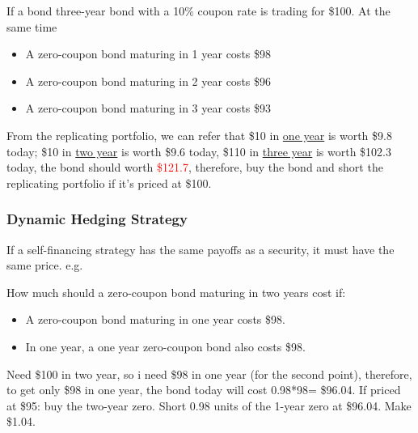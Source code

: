 \begin{multicols}{2}
If a bond three-year bond with a 10\% coupon rate is trading for \$100. At the same time 
\begin{itemize}
    \item A zero-coupon bond maturing in 1 year costs \$98
    \item A zero-coupon bond maturing in 2 year costs \$96
    \item A zero-coupon bond maturing in 3 year costs \$93
\end{itemize}

From the replicating portfolio, we can refer that \$10 in \underline{one year} is worth \$9.8 today; \$10 in \underline{two year} is worth \$9.6 today, \$110 in \underline{three year} is worth \$102.3 today, the bond should worth \textcolor{red}{\$121.7}, therefore, buy the bond and short the replicating portfolio if it's priced at \$100.

\subsubsection{Dynamic Hedging Strategy}
If a self-financing strategy has the same payoffs as a security, it must have the same price. e.g.\par 

How much should a zero-coupon bond maturing in two years cost if:
\begin{itemize}
    \item A zero-coupon bond maturing in one year costs \$98.
    \item In one year, a one year zero-coupon bond also costs \$98.
\end{itemize}
Need \$100 in two year, so i need \$98 in one year (for the second point), therefore, to get only \$98 in one year, the bond today will cost 0.98*98= \$96.04. If priced at \$95: buy the two-year zero. Short 0.98 units of the 1-year zero at \$96.04. Make \$1.04.

\end{multicols}